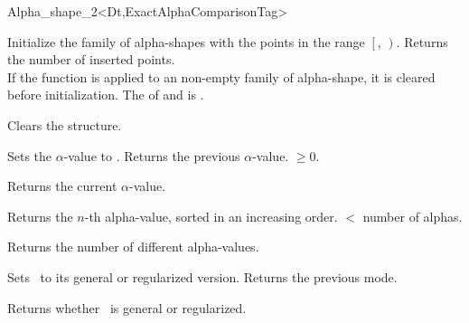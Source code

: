\begin{ccRefClass} {Alpha_shape_2<Dt,ExactAlphaComparisonTag>}
\ccOperations

{Initialize the family of alpha-shapes with the points in the range
$\left[\right.$, $\left.\right)$. Returns the number of
inserted points. \\ 
If the function is applied to an non-empty family of alpha-shape, it is cleared
before initialization.
\ccPrecond The  of  and
 is .}

{Clears the structure.}

{Sets the $\alpha$-value to .
 Returns the previous $\alpha$-value.
\ccPrecond {} $\geq 0$.}

{Returns the current $\alpha$-value.}

{Returns the $n$-th alpha-value, sorted in an increasing order.
 \ccPrecond {} $<$ number of alphas.}

{Returns the number of different alpha-values.}

% 
% 
% 

{Sets \ccVar\ to its general or regularized version. 
Returns the previous mode.}

{Returns whether \ccVar\ is general or regularized.}



\end{ccRefClass}
